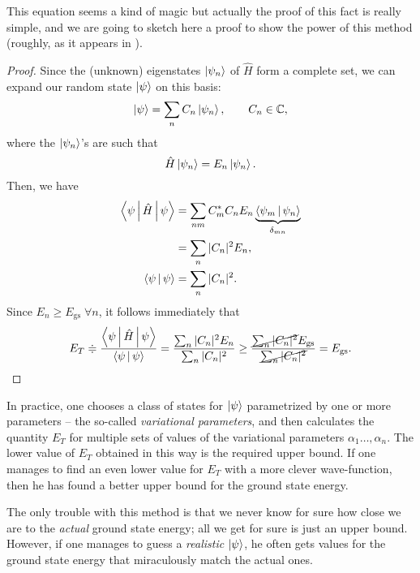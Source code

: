 This equation seems a kind of magic but actually the proof of this fact is really simple, and we are going to sketch here a proof to show the power of this method (roughly, as it appears in \cite{Griffiths2005}).
\begin{proof}
	Since the (unknown) eigenstates $\Ket{\psi_n}$ of $\hat{H}$ form a complete set, we can expand our random state $\Ket{\psi}$ on this basis:
	\begin{equation*}
		\Ket{\psi} = \sum_{n} C_n\Ket{\psi_n},
		\qquad
		C_n \in \mathbb{C},
	\end{equation*}
	where the $\Ket{\psi_n}$'s are such that
	\begin{equation*}
		\hat{H}\Ket{\psi_n} = E_n\Ket{\psi_n}.
	\end{equation*}
	Then, we have
	\begin{align*}
		\Braket{\psi|\hat{H}|\psi}
		&= \sum_{nm} C_m^* C_n E_n \underbrace{\Braket{\psi_m|\psi_n}}_{\delta_{mn}} \\
		&= \sum_{n} |C_n|^2 E_n, \\
		\Braket{\psi|\psi}
		&= \sum_{n} |C_n|^2.
	\end{align*}
	Since $E_n \geq E_{\text{gs}} \; \forall n$, it follows immediately that
	\begin{equation}
		E_T 
		\doteqdot \frac{\Braket{\psi|\hat{H}|\psi}}{\Braket{\psi|\psi}}
		= \frac{\sum_{n} |C_n|^2 E_n}{\sum_{n} |C_n|^2}
		\geq \frac{\cancel{\sum_{n} |C_n|^2} E_{\text{gs}}}{\cancel{\sum_{n} |C_n|^2}}
		= E_{\text{gs}}.
		\label{eq:var_princ_end_proof}
	\end{equation}
\end{proof}

In practice, one chooses a class of states for $\Ket{\psi}$ parametrized by one or more parameters -- the so-called \emph{variational parameters}, and then calculates the quantity $E_T$ for multiple sets of values of the variational parameters $\alpha_1\ldots,\alpha_n$. The lower value of $E_T$ obtained in this way is the required upper bound. If one manages to find an even lower value for $E_T$ with a more clever wave-function, then he has found a better upper bound for the ground state energy.

The only trouble with this method is that we never know for sure how close we are to the \emph{actual} ground state energy; all we get for sure is just an upper bound. However, if one manages to guess a \emph{realistic} $\Ket{\psi}$, he often gets values for the ground state energy that miraculously match the actual ones.

